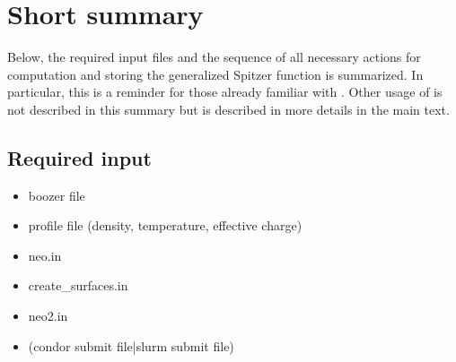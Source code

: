 \documentclass{article}
\newcommand{\vv}[1]{\texttt{\detokenize{#1}}}
\begin{document}
\section{Short summary}
Below, the required input files and the sequence of all necessary
actions for computation and storing the generalized Spitzer function is
summarized. In particular, this is a reminder for  those already
familiar with \vv{NEO-2}. Other usage of \vv{NEO-2} is not described in this
summary but is described in more details in the main text.
\subsection{Required input}
\begin{itemize}
  \item boozer file
  \item profile file (density, temperature, effective charge)
  \item neo.in
  \item create\_surfaces.in
  \item neo2.in
  \item (condor submit file|slurm submit file)
\end{itemize}
\end{document}
